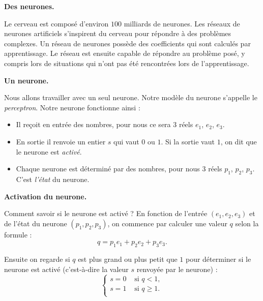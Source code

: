 \documentclass[11pt,class=report,crop=false]{standalone}
\begin{document}

\begin{cours}[Neurone]
	

\textbf{Des neurones.}

Le cerveau est composé d'environ $100$ milliards de neurones.
Les réseaux de neurones artificiels s'inspirent du cerveau pour répondre à des problèmes complexes.
Un réseau de neurones possède des coefficients qui sont calculés par apprentissage. Le réseau est ensuite capable de répondre au problème posé, y compris lors de situations qui n'ont pas été rencontrées lors de l'apprentissage.

\medskip

\textbf{Un neurone.}

Nous allons travailler avec un seul neurone. Notre modèle du neurone s'appelle le \emph{perceptron}.
Notre neurone fonctionne ainsi :
\begin{itemize}
	\item Il reçoit en entrée des nombres, pour nous ce sera $3$ réels $e_1$, $e_2$, $e_3$.
	\item En sortie il renvoie un entier $s$ qui vaut $0$ ou $1$. Si la sortie vaut $1$, on dit que le neurone est \emph{activé}.
	\item Chaque neurone est déterminé par des nombres, pour nous $3$ réels $p_1$, $p_2$, $p_3$. C'est \emph{l'état} du neurone.	
\end{itemize}


\medskip

\textbf{Activation du neurone.}
	
Comment savoir si le neurone est activé ? 
En fonction de l'entrée $(e_1,e_2,e_3)$ et de l'état du neurone $(p_1,p_2,p_3)$, 
on commence par calculer une valeur $q$ selon la formule :
$$q = p_1 e_1 + p_2e_2+p_3e_3.$$

Ensuite on regarde si $q$ est plus grand ou plus petit que $1$ pour déterminer si le neurone
est activé (c'est-à-dire la valeur $s$ renvoyée par le neurone) :
$$\left\{ 
\begin{array}{rl}
s = 0  & \text{ si } q < 1, \\ 	
s = 1 & \text{ si } q \ge 1. \\
\end{array}
\right.$$


\end{cours}
\end{document}
